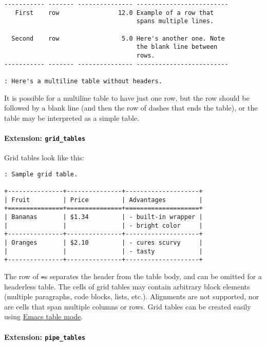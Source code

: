 \documentclass[]{article}
\let\oldparagraph\paragraph
\renewcommand{\paragraph}[1]{\oldparagraph{#1}\mbox{}}
\begin{document}
\begin{verbatim}
----------- ------- --------------- -------------------------
   First    row                12.0 Example of a row that
                                    spans multiple lines.

  Second    row                 5.0 Here's another one. Note
                                    the blank line between
                                    rows.
----------- ------- --------------- -------------------------

: Here's a multiline table without headers.
\end{verbatim}

It is possible for a multiline table to have just one row, but the row
should be followed by a blank line (and then the row of dashes that ends
the table), or the table may be interpreted as a simple table.

\paragraph{\texorpdfstring{Extension:
\texttt{grid\_tables}}{Extension: grid\_tables}}\label{extension-grid_tables}

Grid tables look like this:

\begin{verbatim}
: Sample grid table.

+---------------+---------------+--------------------+
| Fruit         | Price         | Advantages         |
+===============+===============+====================+
| Bananas       | $1.34         | - built-in wrapper |
|               |               | - bright color     |
+---------------+---------------+--------------------+
| Oranges       | $2.10         | - cures scurvy     |
|               |               | - tasty            |
+---------------+---------------+--------------------+
\end{verbatim}

The row of \texttt{=}s separates the header from the table body, and can
be omitted for a headerless table. The cells of grid tables may contain
arbitrary block elements (multiple paragraphs, code blocks, lists,
etc.). Alignments are not supported, nor are cells that span multiple
columns or rows. Grid tables can be created easily using
\href{http://table.sourceforge.net/}{Emacs table mode}.

\paragraph{\texorpdfstring{Extension:
\texttt{pipe\_tables}}{Extension: pipe\_tables}}\label{extension-pipe_tables}
\end{document}
